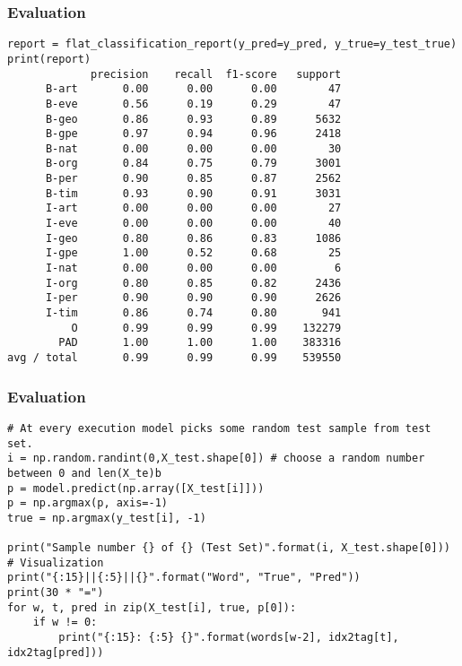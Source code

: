 \begin{frame}[fragile]\frametitle{Evaluation}

\begin{lstlisting}
report = flat_classification_report(y_pred=y_pred, y_true=y_test_true)
print(report)
             precision    recall  f1-score   support
      B-art       0.00      0.00      0.00        47
      B-eve       0.56      0.19      0.29        47
      B-geo       0.86      0.93      0.89      5632
      B-gpe       0.97      0.94      0.96      2418
      B-nat       0.00      0.00      0.00        30
      B-org       0.84      0.75      0.79      3001
      B-per       0.90      0.85      0.87      2562
      B-tim       0.93      0.90      0.91      3031
      I-art       0.00      0.00      0.00        27
      I-eve       0.00      0.00      0.00        40
      I-geo       0.80      0.86      0.83      1086
      I-gpe       1.00      0.52      0.68        25
      I-nat       0.00      0.00      0.00         6
      I-org       0.80      0.85      0.82      2436
      I-per       0.90      0.90      0.90      2626
      I-tim       0.86      0.74      0.80       941
          O       0.99      0.99      0.99    132279
        PAD       1.00      1.00      1.00    383316
avg / total       0.99      0.99      0.99    539550
\end{lstlisting}
\end{frame}

\begin{frame}[fragile]\frametitle{Evaluation}

\begin{lstlisting}
# At every execution model picks some random test sample from test set.
i = np.random.randint(0,X_test.shape[0]) # choose a random number between 0 and len(X_te)b
p = model.predict(np.array([X_test[i]]))
p = np.argmax(p, axis=-1)
true = np.argmax(y_test[i], -1)

print("Sample number {} of {} (Test Set)".format(i, X_test.shape[0]))
# Visualization
print("{:15}||{:5}||{}".format("Word", "True", "Pred"))
print(30 * "=")
for w, t, pred in zip(X_test[i], true, p[0]):
    if w != 0:
        print("{:15}: {:5} {}".format(words[w-2], idx2tag[t], idx2tag[pred]))
\end{lstlisting}
\end{frame}

